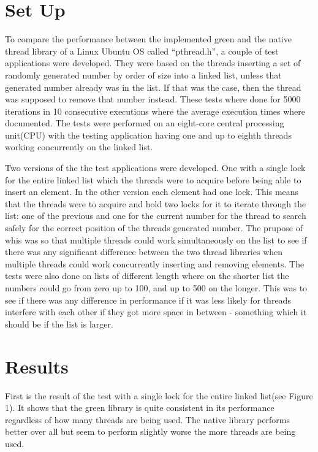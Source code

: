 \documentclass{article}
\begin{document}
\section{Set Up}\label{setup}

To compare the performance between the implemented green and the native thread library of a Linux Ubuntu OS called “pthread.h”, a couple of test applications were developed. They were based on the threads inserting a set of randomly generated number by order of size into a linked list, unless that generated number already was in the list. If that was the case, then the thread was supposed to remove that number instead. These tests where done for 5000 iterations in 10 consecutive executions where the average execution times where documented. The tests were performed on an eight-core central processing unit(CPU) with the testing application having one and up to eighth threads working concurrently on the linked list. 

Two versions of the the test applications were developed. One with a single lock for the entire linked list which the threads were to acquire before being able to insert an element. In the other version each element had one lock. This means that the threads were to acquire and hold two locks for it to iterate through the list: one of the previous and one for the current number for the thread to search safely for the correct position of the threads generated number. The prupose of whis was so that multiple threads could work simultaneously on the list to see if there was any significant difference between the two thread libraries when multiple threads could work concurrently inserting and removing elements. The tests were also done on lists of different length where on the shorter list the numbers could go from zero up to 100, and up to 500 on the longer. This was to see if there was any difference in performance if it was less likely for threads interfere with each other if they got more space in between - something which it should be if the list is larger. 

\newpage

\section{Results}\label{results}

First is the result of the test with a single lock for the entire linked list(see Figure 1). It shows that the green library is quite consistent in its performance regardless of how many threads are being used. The native library performs better over all but seem to perform slightly worse the more threads are being used. 
\end{document}
